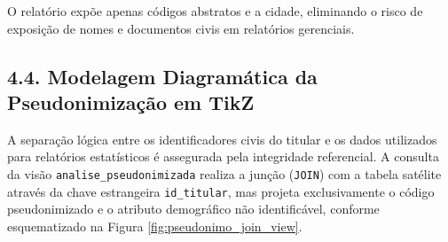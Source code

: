 O relatório expõe apenas códigos abstratos e a cidade, eliminando o risco de exposição de nomes e documentos civis em relatórios gerenciais.

\subsection*{4.4. Modelagem Diagramática da Pseudonimização em TikZ}

A separação lógica entre os identificadores civis do titular e os dados utilizados para relatórios estatísticos é assegurada pela integridade referencial. A consulta da visão \texttt{analise\_pseudonimizada} realiza a junção (\texttt{JOIN}) com a tabela satélite através da chave estrangeira \texttt{id\_titular}, mas projeta exclusivamente o código pseudonimizado e o atributo demográfico não identificável, conforme esquematizado na Figura \ref{fig:pseudonimo_join_view}.

